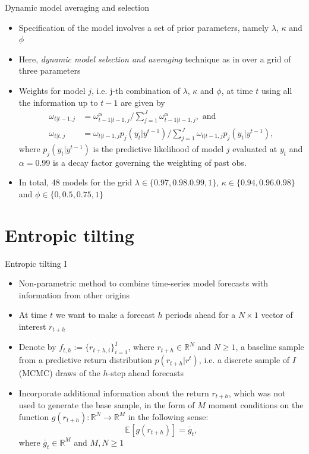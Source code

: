 \documentclass[9pt,xcolor=x11names,compress]{beamer}
\let\oldcite=\cite
\renewcommand{\cite}[1]{\textcolor{dblue}{\oldcite{#1}}}
\theoremstyle{standard}
\theoremstyle{notes}
\begin{document}
\begin{frame}{Dynamic model averaging and selection}
	\begin{itemize}
		\item Specification of the model involves a set of prior parameters, namely $\lambda$, $\kappa$ and $\phi$
		\item Here,  \textit{dynamic model selection and averaging} technique as in \cite{raftery2010} over a grid of three parameters
		\item Weights for model $j$, i.e. j-th combination of $\lambda$, $\kappa$ and $\phi$, at time $t$ using all the information up to $t-1$ are given by
		\begin{align}
		\omega_{t|t-1,j}&=\omega_{t-1|t-1,j}^{\alpha}\Big/\sum_{j=1}^J\omega_{t-1|t-1,j}^{\alpha},\text{ and}\\
		\omega_{t|t,j}&=\omega_{t|t-1,j}p_j(y_t|y^{t-1})\Big/\sum_{j=1}^J\omega_{t|t-1,j}p_j(y_t|y^{t-1}),
		\end{align}
		where $p_j(y_t|y^{t-1})$ is the predictive likelihood of model $j$ evaluated at $y_t$ and $\alpha=0.99$ is a decay factor governing the weighting of past obs.
		\item In total, 48 models for the grid $\lambda\in\{0.97, 0.98.0.99, 1\}$, $\kappa\in\{0.94, 0.96.0.98\}$ and $\phi\in\{0,0.5,0.75,1\}$
	\end{itemize}
\end{frame}

\section{Entropic tilting}

\begin{frame}{Entropic tilting I}
	\begin{itemize}
		\item Non-parametric method to combine time-series model forecasts with information from other origins
		\item At time $t$ we want to make a forecast $h$ periods ahead for a $N\times1$ vector of interest $r_{t+h}$
		\item Denote by $f_{t,h}:=\{r_{t+h,i}\}_{i=1}^I$, where $r_{t+h}\in\mathbb{R}^N$ and $N\geq 1$, a baseline sample from a predictive return distribution $p(r_{t+h}|r^t)$, i.e. a discrete sample of $I$ (MCMC) draws of the $h$-step ahead forecasts
		\item Incorporate additional information about the return $r_{t+h}$, which was not used to generate the base sample, in the form of $M$ moment conditions on the function $g(r_{t+h}):\mathbb{R}^N\to\mathbb{R}^M$  in the following sense:
		\begin{equation}\label{eqn:gmom}
		\mathbb{E}\left[g(r_{t+h})\right]=\bar{g}_t,
		\end{equation}
		where $\bar{g}_t\in \mathbb{R}^M$ and $M,N\geq1$
	\end{itemize}
\end{frame}
\end{document}
